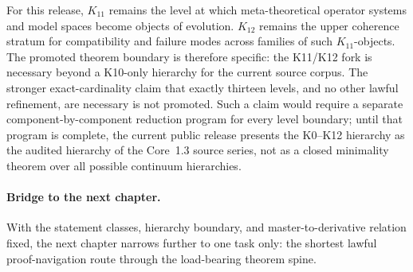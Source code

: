 For this release, \(K_{11}\) remains the level at which meta-theoretical
operator systems and model spaces become objects of evolution. \(K_{12}\)
remains the upper coherence stratum for compatibility and failure modes across
families of such \(K_{11}\)-objects. The promoted theorem boundary is therefore
specific: the K11/K12 fork is necessary beyond a K10-only hierarchy for the
current source corpus. The stronger exact-cardinality claim that exactly
thirteen levels, and no other lawful refinement, are necessary is not promoted.
Such a claim would require a separate component-by-component reduction program
for every level boundary; until that program is complete, the current public
release presents the K0--K12 hierarchy as the audited hierarchy of the Core~1.3
source series, not as a closed minimality theorem over all possible continuum
hierarchies.

\paragraph{Bridge to the next chapter.}
With the statement classes, hierarchy boundary, and master-to-derivative
relation fixed, the next chapter narrows further to one task only: the shortest
lawful proof-navigation route through the load-bearing theorem spine.

\clearpage
